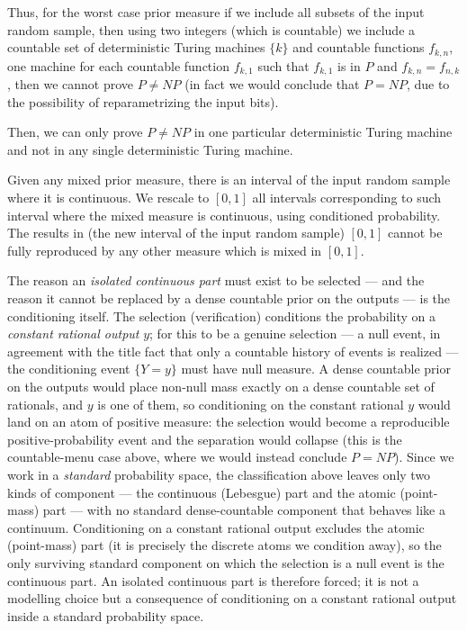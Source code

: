 \documentclass[11pt,a4paper]{report}
\begin{document}
Thus, for the worst case prior measure if we include all subsets of the
input random sample, then using two integers (which is countable) we
include a countable set of deterministic Turing machines \(\{k\}\) and
countable functions \(f_{k,n}\), one machine for each countable function
\(f_{k,1}\) such that \(f_{k,1}\) is in \(P\) and \(f_{k,n}=f_{n,k}\),
then we cannot prove \(P\neq NP\) (in fact we would conclude that
\(P=NP\), due to the possibility of reparametrizing the input bits).

Then, we can only prove \(P\neq NP\) in one particular deterministic
Turing machine and not in any single deterministic Turing machine.

Given any mixed prior measure, there is an interval of the input random
sample where it is continuous. We rescale to \([0,1]\) all intervals
corresponding to such interval where the mixed measure is continuous,
using conditioned probability. The results in (the new interval of the
input random sample) \([0,1]\) cannot be fully reproduced by any other
measure which is mixed in \([0,1]\).

The reason an \emph{isolated continuous part} must exist to be selected ---
and the reason it cannot be replaced by a dense countable prior on the outputs
--- is the conditioning itself. The selection (verification) conditions the
probability on a \emph{constant rational output} \(y\); for this to be a
genuine selection --- a null event, in agreement with the title fact that only
a countable history of events is realized --- the conditioning event
\(\{Y = y\}\) must have null measure. A dense countable prior on the outputs
would place non-null mass exactly on a dense countable set of rationals, and
\(y\) is one of them, so conditioning on the constant rational \(y\) would land
on an atom of positive measure: the selection would become a reproducible
positive-probability event and the separation would collapse (this is the
countable-menu case above, where we would instead conclude \(P=NP\)). Since we
work in a \emph{standard} probability space, the classification above leaves
only two kinds of component --- the continuous (Lebesgue) part and the
atomic (point-mass) part --- with no standard dense-countable component that
behaves like a continuum. Conditioning on a constant rational output excludes
the atomic (point-mass) part (it is precisely the discrete atoms we condition
away), so the only surviving standard component on which the selection is a
null event is the continuous part. An isolated continuous part is therefore
forced; it is not a modelling choice but a consequence of conditioning on a
constant rational output inside a standard probability space.
\end{document}
